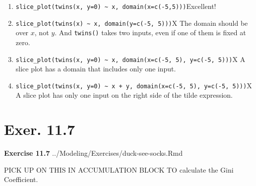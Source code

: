 \documentclass[
  letterpaper,
  DIV=11,
  numbers=noendperiod,
  oneside]{article}
\providecommand{\tightlist}{%
  \setlength{\itemsep}{0pt}\setlength{\parskip}{0pt}}\usepackage{longtable,booktabs,array}
\begin{document}
\begin{multicols}{2}
\begin{table}
\begin{minipage}[t]{\linewidth}
{\begin{enumerate}
\def\labelenumi{\roman{enumi}.}
\tightlist
\item
  {\texttt{slice\_plot(twins(x,\ y=0)\ \textasciitilde{}\ x,\ domain(x=c(-5,5)))}{Excellent!~}}\\
\item
  {\texttt{slice\_plot(twins(x)\ \textasciitilde{}\ x,\ domain(y=c(-5,\ 5)))}{︎X
  The domain should be over \(x\), not \(y\). And \texttt{twins()} takes
  two inputs, even if one of them is fixed at zero.}}\\
\item
  {\texttt{slice\_plot(twins(x,\ y=0)\ \textasciitilde{}\ x,\ domain(x=c(-5,\ 5),\ y=c(-5,\ 5)))}{︎X
  A slice plot has a domain that includes only one input.}}\\
\item
  {\texttt{slice\_plot(twins(x,\ y=0)\ \textasciitilde{}\ x\ +\ y,\ domain(x=c(-5,\ 5),\ y=c(-5,\ 5)))}{︎X
  A slice plot has only one input on the right side of the tilde
  expression.}}
\end{enumerate}

}

\end{minipage}%
\newline
\begin{minipage}[t]{\linewidth}

{\centering 

\hypertarget{exer.-11.7}{%
\section*{Exer. 11.7}\label{exer.-11.7}}

\textbf{Exercise 11.7} ../Modeling/Exercises/duck-see-socks.Rmd

}

\end{minipage}%
\newline
\begin{minipage}[t]{\linewidth}

{\centering 

PICK UP ON THIS IN ACCUMULATION BLOCK TO calculate the Gini Coefficient.

}

\end{minipage}%
\newline
\begin{minipage}[t]{\linewidth}

{\centering 

}
\end{minipage}
\end{table}
\end{multicols}
\end{document}
